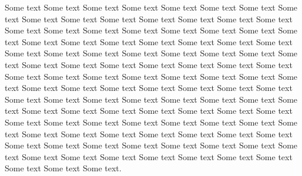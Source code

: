 
  Some text Some text Some text Some text Some text Some text Some
  text Some text Some text Some text Some text Some text Some text
  Some text Some text Some text Some text Some text Some text Some
  text Some text Some text Some text Some text Some text Some text
  Some text Some text Some text Some text Some text Some text Some
  text Some text Some text Some text Some text Some text Some text
  Some text Some text Some text Some text Some text Some text Some
  text Some text Some text Some text Some text Some text Some text
  Some text Some text Some text Some text Some text Some text Some
  text Some text Some text Some text Some text Some text Some text
  Some text Some text Some text Some text Some text Some text Some
  text Some text Some text Some text Some text Some text Some text
  Some text Some text Some text Some text Some text Some text Some
  text Some text Some text Some text Some text Some text Some text
  Some text Some text Some text Some text Some text Some text Some
  text Some text Some text Some text Some text Some text Some text
  Some text Some text Some text Some text.


